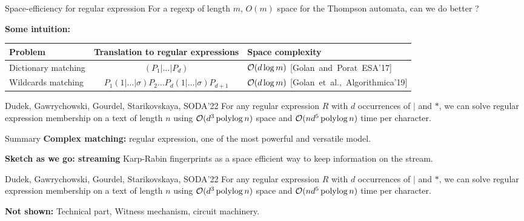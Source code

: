 {\renewcommand{\arraystretch}{2}
\begin{frame}{Space-efficiency for regular expression}
    For a regexp of length $m$, $O(m)$ space for the Thompson automata, can we do better ? \pause

    \medskip
    \textbf{Some intuition:}  \pause

    \medskip
    \begin{tabular}{l c p{}}
        Problem & Translation to regular expressions & Space complexity\\ 
        \hline \pause
        Dictionary matching & $(P_{1}|\ldots | P_{d})$ & $\mathcal{O}(d\log m)$  \mbox{\footnotesize [Golan~and~Porat~ESA'17]}\\ \pause
        Wildcards matching & $P_{1}(1|\ldots|\sigma)P_{2}\ldots P_{d}(1|\ldots|\sigma)P_{d+1}$ & $\mathcal{O}(d\log m)$ \mbox{\footnotesize [Golan et al.,~Algorithmica'19]} \pause
    \end{tabular}

    \medskip
    \begin{myalertblock}{Dudek, Gawrychowski, Gourdel, Starikovskaya, SODA'22}
        For any regular expression $R$ with $d$ occurrences of $|$ and $\ast$, we can solve regular expression membership on a text of length $n$ using $\mathcal{O}(d^{3}\operatorname{polylog} n)$ space and $\mathcal{O}(nd^{5}\operatorname{polylog} n)$ time per character.
    \end{myalertblock}
\end{frame}
}

\begin{frame}{Summary}
    \textbf{Complex matching:} regular expression, one of the most powerful and versatile model.

    \vfill
    
    \textbf{Sketch as we go: streaming} Karp-Rabin fingerprints as a space efficient way to keep information on the stream.

    \begin{myalertblock}{Dudek, Gawrychowski, Gourdel, Starikovskaya, SODA'22}
        For any regular expression $R$ with $d$ occurrences of $|$ and $\ast$, we can solve regular expression membership on a text of length $n$ using $\mathcal{O}(d^{3}\operatorname{polylog} n)$ space and $\mathcal{O}(nd^{5}\operatorname{polylog} n)$ time per character.
    \end{myalertblock}
    \vfill
    \textbf{Not shown:} Technical part, Witness mechanism, circuit machinery.
\end{frame}